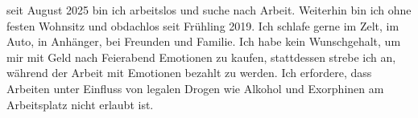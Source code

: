 		seit August 2025 bin ich arbeitslos und suche nach Arbeit.
		Weiterhin bin ich ohne festen Wohnsitz und obdachlos seit Frühling 2019.
		Ich schlafe gerne im Zelt, im Auto, in Anhänger, bei Freunden und Familie.
		Ich habe kein Wunschgehalt, um mir mit Geld nach Feierabend Emotionen zu kaufen, stattdessen strebe ich an, während der Arbeit mit Emotionen bezahlt zu werden.
		Ich erfordere, dass Arbeiten unter Einfluss von legalen Drogen wie Alkohol und Exorphinen am Arbeitsplatz nicht erlaubt ist.